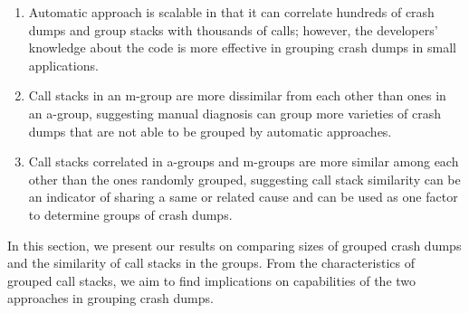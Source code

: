 \begin{enumerate}
\item Automatic approach is scalable in that it can correlate hundreds of crash dumps and group stacks with thousands of calls; however, the developers' knowledge about the code is more effective in grouping crash dumps in small applications.
\item Call stacks in an m-group are more dissimilar from each other than ones in an a-group, suggesting manual diagnosis can group more varieties of crash dumps that are not able to be grouped by automatic approaches.
\item Call stacks correlated in a-groups and m-groups are more similar among each other than the ones randomly grouped, suggesting call stack similarity can be an indicator of  sharing a same or related cause and can be used as one factor to determine groups of crash dumps.

\end{enumerate}
\begin{table*}
\centering
\caption{Sizes of Crash Dump Groups and Call Stacks in m-Group and a-Group\label{tab:size}}
\end{table*}

In this section, we present our results on comparing sizes of grouped crash dumps and the similarity of call stacks in the groups. From the characteristics of grouped call stacks, we aim to find implications on capabilities of the two approaches in grouping crash dumps.

